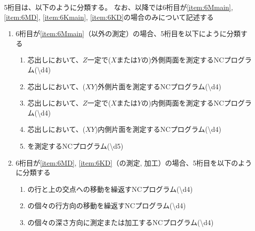 \clearpage
5桁目は、以下のように分類する。
なお、以降では6桁目が\ref{item:6Mmain}, \ref{item:6MD}, \ref{item:6Kmain}, \ref{item:6KD}の場合のみについて記述する
\begin{enumerate}[label=\alph*)]
\item 6桁目が\ref{item:6Mmain}（\Dimple 以外の測定）の場合、5桁目を以下にように分類する
  \begin{enumerate}[label=\arabic*., ref=\arabic*, start=1]
  \item%
    芯出しにおいて、$Z$一定で($X$または$Y$の)外側両面を測定するNCプログラム({\textbackslash d{4}})
  \item%
    芯出しにおいて、($XY$)外側片面を測定するNCプログラム({\textbackslash d{4}})
  \item%
    芯出しにおいて、$Z$一定で($X$または$Y$の)内側両面を測定するNCプログラム({\textbackslash d{4}})
  \item%
    芯出しにおいて、($XY$)内側片面を測定するNCプログラム({\textbackslash d{4}})
  \item%
    \CenterlineEndFaceDif を測定するNCプログラム({\textbackslash d{5}})
  \end{enumerate}
\item 6桁目が\ref{item:6MD}, \ref{item:6KD}（\Dimple の測定, 加工）の場合、5桁目を以下のように分類する
  \begin{enumerate}[label=\arabic*., ref=\arabic*]
  \item \Dimple の行と\CenterCurvatureLine 上の交点への移動を繰返すNCプログラム({\textbackslash d{4}})
  \item \Dimple の個々の行方向の移動を繰返すNCプログラム({\textbackslash d{4}})
  \item \Dimple の個々の深さ方向に測定または加工するNCプログラム({\textbackslash d{4}})
  \end{enumerate}

\end{enumerate}

